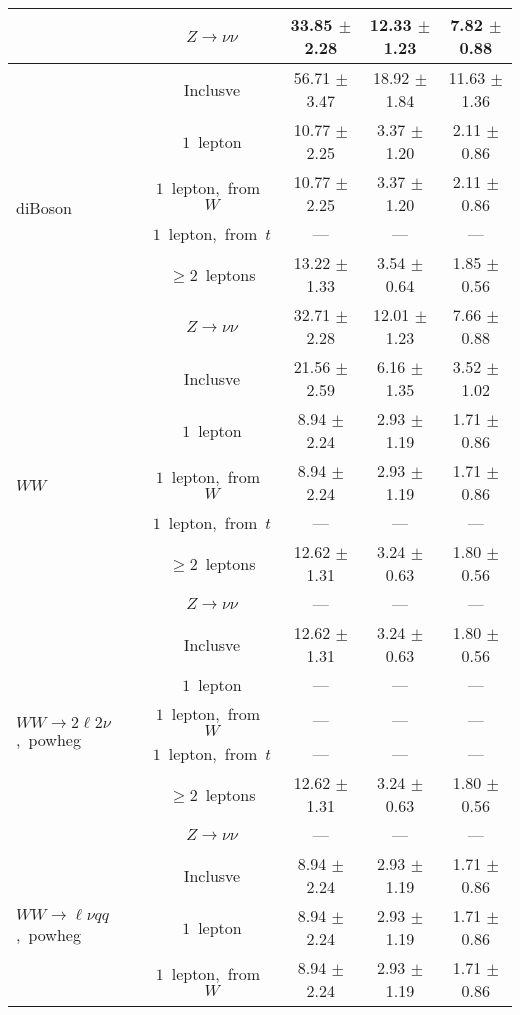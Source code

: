 \documentclass{article}
\begin{document}
\begin{longtable}{|l|c|c|c|c|}
 & $Z\rightarrow\nu\nu$  & 33.85 $\pm$ 2.28  & 12.33 $\pm$ 1.23  & 7.82 $\pm$ 0.88 \\* 
\hline 
\multirow{6}{*}{diBoson} & Inclusve  & 56.71 $\pm$ 3.47  & 18.92 $\pm$ 1.84  & 11.63 $\pm$ 1.36 \\* 
 & $1$~lepton  & 10.77 $\pm$ 2.25  & 3.37 $\pm$ 1.20  & 2.11 $\pm$ 0.86 \\* 
 & $1$~lepton,~from~$W$  & 10.77 $\pm$ 2.25  & 3.37 $\pm$ 1.20  & 2.11 $\pm$ 0.86 \\* 
 & $1$~lepton,~from~$t$  & ---  & ---  & --- \\* 
 & $\ge2$~leptons  & 13.22 $\pm$ 1.33  & 3.54 $\pm$ 0.64  & 1.85 $\pm$ 0.56 \\* 
 & $Z\rightarrow\nu\nu$  & 32.71 $\pm$ 2.28  & 12.01 $\pm$ 1.23  & 7.66 $\pm$ 0.88 \\* 
\hline 
\multirow{6}{*}{$WW$} & Inclusve  & 21.56 $\pm$ 2.59  & 6.16 $\pm$ 1.35  & 3.52 $\pm$ 1.02 \\* 
 & $1$~lepton  & 8.94 $\pm$ 2.24  & 2.93 $\pm$ 1.19  & 1.71 $\pm$ 0.86 \\* 
 & $1$~lepton,~from~$W$  & 8.94 $\pm$ 2.24  & 2.93 $\pm$ 1.19  & 1.71 $\pm$ 0.86 \\* 
 & $1$~lepton,~from~$t$  & ---  & ---  & --- \\* 
 & $\ge2$~leptons  & 12.62 $\pm$ 1.31  & 3.24 $\pm$ 0.63  & 1.80 $\pm$ 0.56 \\* 
 & $Z\rightarrow\nu\nu$  & ---  & ---  & --- \\* 
\hline 
\multirow{6}{*}{$WW{\rightarrow}2\ell2\nu$,~powheg} & Inclusve  & 12.62 $\pm$ 1.31  & 3.24 $\pm$ 0.63  & 1.80 $\pm$ 0.56 \\* 
 & $1$~lepton  & ---  & ---  & --- \\* 
 & $1$~lepton,~from~$W$  & ---  & ---  & --- \\* 
 & $1$~lepton,~from~$t$  & ---  & ---  & --- \\* 
 & $\ge2$~leptons  & 12.62 $\pm$ 1.31  & 3.24 $\pm$ 0.63  & 1.80 $\pm$ 0.56 \\* 
 & $Z\rightarrow\nu\nu$  & ---  & ---  & --- \\* 
\hline 
\multirow{6}{*}{$WW{\rightarrow}{\ell}{\nu}qq$,~powheg} & Inclusve  & 8.94 $\pm$ 2.24  & 2.93 $\pm$ 1.19  & 1.71 $\pm$ 0.86 \\* 
 & $1$~lepton  & 8.94 $\pm$ 2.24  & 2.93 $\pm$ 1.19  & 1.71 $\pm$ 0.86 \\* 
 & $1$~lepton,~from~$W$  & 8.94 $\pm$ 2.24  & 2.93 $\pm$ 1.19  & 1.71 $\pm$ 0.86 \\* 

\end{longtable}
\end{document}
